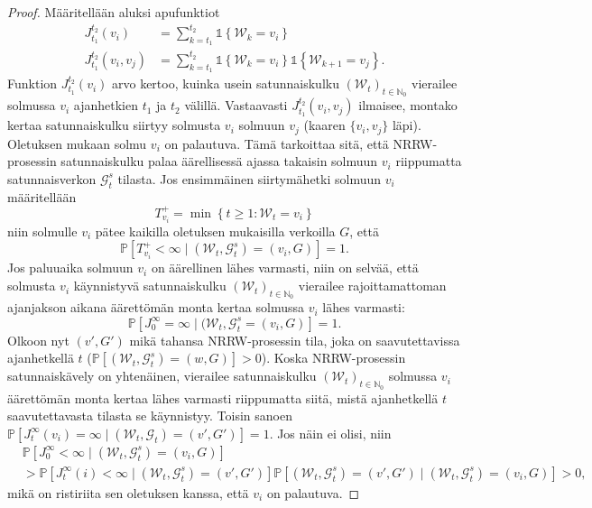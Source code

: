 \documentclass[finnish, 12pt, a4paper, sci, utf8, pdfa]{aaltothesis}
\newcommand{\N}{\mathbb{N}}
\newcommand{\Grandom}{\mathcal{G}}
\newcommand{\Wrandom}{\mathcal{W}}
\newcommand{\indicator}{\mathopen{\mathds{1}}}
\newcommand*{\prob}{\mathbb{P}}
\begin{document}
\begin{proof}
   Määritellään aluksi apufunktiot
   \begin{align*}
      J_{t_{1}}^{t_{2}}(v_{i})         &= \sum_{k = t_{1}}^{t_{2}} \indicator \left\{ \Wrandom_{k} = v_{i} \right\} \\
      J_{t_{1}}^{t_{2}}(v_{i}, v_{j})  &= \sum_{k = t_{1}}^{t_{2}} \indicator \left\{ \Wrandom_{k} = v_{i} \right\} \indicator \left\{ \Wrandom_{k+1} = v_{j} \right\}.
   \end{align*}
   Funktion $ J_{t_{1}}^{t_{2}}(v_{i}) $ arvo kertoo, kuinka usein satunnaiskulku $ (\Wrandom_{t})_{t \in \N_{0}} $ vierailee solmussa $ v_{i} $ ajanhetkien $ t_{1} $ ja $ t_{2} $ välillä.
   Vastaavasti $ J_{t_{1}}^{t_{2}}(v_{i}, v_{j}) $ ilmaisee, montako kertaa satunnaiskulku siirtyy solmusta $ v_{i} $ solmuun $ v_{j} $ (kaaren $ \{ v_{i}, v_{j} \} $ läpi).
   Oletuksen mukaan solmu $ v_{i} $ on palautuva. Tämä tarkoittaa sitä, että NRRW-prosessin satunnaiskulku palaa äärellisessä ajassa takaisin solmuun $ v_{i} $ riippumatta satunnaisverkon
   $ \Grandom_{t}^{s} $ tilasta. Jos ensimmäinen siirtymähetki solmuun $ v_{i} $ määritellään
   \[
      T_{v_{i}}^{+} = \min \left\{ t \geq 1 : \Wrandom_{t} = v_{i} \right\}
   \]
   niin solmulle $ v_{i} $ pätee kaikilla oletuksen mukaisilla verkoilla $ G $, että
   \[
      \prob \left[ T_{v_{i}}^{+} < \infty \mid (\Wrandom_{t}, \Grandom_{t}^{s}) = (v_{i}, G) \right] = 1.
   \]
   Jos paluuaika solmuun $ v_{i} $ on äärellinen lähes varmasti, niin on selvää, että solmusta $ v_{i} $ käynnistyvä satunnaiskulku $ (\Wrandom_{t})_{t \in \N_{0}} $ vierailee
   rajoittamattoman ajanjakson aikana äärettömän monta kertaa solmussa $ v_{i} $ lähes varmasti:
   \begin{equation}
      \prob \left[ J_{0}^{\infty} = \infty \mid (\Wrandom_{t}, \Grandom_{t}^{s} = (v_{i}, G) \right] = 1.
      \label{equation:oletus}
   \end{equation}
   Olkoon nyt $ (v', G') $ mikä tahansa NRRW-prosessin tila, joka on saavutettavissa ajanhetkellä $ t $ ($ \prob \left[ (\Wrandom_{t}, \Grandom_{t}^{s}) = (w, G) \right] > 0 $).
   Koska NRRW-prosessin satunnaiskävely on yhtenäinen, vierailee satunnaiskulku $ (\Wrandom_{t})_{t \in \N_{0}} $ solmussa $ v_{i} $ äärettömän monta kertaa lähes varmasti riippumatta 
   siitä, mistä ajanhetkellä $ t $ saavutettavasta tilasta se käynnistyy. Toisin sanoen $ \prob \left[ J_{t}^{\infty}(v_{i}) = \infty \mid (\Wrandom_{t}, \Grandom_{t}) = (v', G') \right] = 1 $.
   Jos näin ei olisi, niin
   \[
      \begin{split}
      & \prob \left[ J_{0}^{\infty} < \infty \mid (\Wrandom_{t}, \Grandom_{t}^{s}) = (v_{i}, G) \right] \\
      & > \prob \left[ J_{t}^{\infty}(i) < \infty \mid (\Wrandom_{t}, \Grandom_{t}^{s}) = (v', G') \right] \prob \left[ (\Wrandom_{t}, \Grandom_{t}^{s}) = (v', G') \mid (\Wrandom_{t}, \Grandom_{t}^{s}) = (v_{i}, G) \right] > 0,
      \end{split}
   \]
   mikä on ristiriita sen oletuksen kanssa, että $ v_{i} $ on palautuva.


\end{proof}
\end{document}
